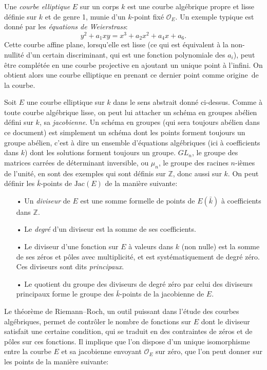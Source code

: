 \documentclass[11pt,a4paper]{article}
\newcommand{\Z}{\mathbb{Z}}
\renewcommand{\O}{\mathcal{O}}
\newcommand{\Jac}{\mathrm{Jac}}
\theoremstyle{definition}
\begin{document}
Une \emph{courbe elliptique} $E$ sur un corps $k$ est une courbe algébrique propre et lisse définie sur $k$ et de genre 1, munie d'un $k$-point fixé $\O_E$. Un exemple typique est donné par les \emph{équations de Weierstrass}:
$$y^2 + a_1xy = x^3 + a_2x^2 + a_4 x + a_6.$$
Cette courbe affine plane, lorsqu'elle est lisse (ce qui est équivalent à la non-nullité d'un certain discriminant, qui est une fonction polynomiale des $a_i$), peut être complétée en une courbe projective en ajoutant un unique point à l'infini. On obtient alors une courbe elliptique en prenant ce dernier point comme \og origine\fg\ de la courbe.

Soit $E$ une courbe elliptique sur $k$ dans le sens abstrait donné ci-dessus. Comme à toute courbe algébrique lisse, on peut lui attacher un schéma en groupes abélien défini sur $k$, sa \emph{jacobienne}. Un schéma en groupes (qui sera toujours abélien dans ce document) est simplement un schéma dont les points forment toujours un groupe abélien, c'est à dire un ensemble d'équations algébriques (ici à coefficients dans $k$) dont les solutions forment toujours un groupe. $GL_n$, le groupe des matrices carrées de déterminant inversible, ou $\mu_n$, le groupe des racines $n$-ièmes de l'unité, en sont des exemples qui sont définis sur $\Z$, donc aussi sur $k$. On peut définir les $\bar{k}$-points de $\Jac(E)$ de la manière suivante:
\begin{itemize}
\item[•] Un \emph{diviseur} de $E$ est une somme formelle de points de $E(\bar{k})$ à coefficients dans $\Z$.
\item[•] Le \emph{degré} d'un diviseur est la somme de ses coefficients.
\item[•] Le diviseur d'une fonction sur $E$ à valeurs dans $k$ (non nulle) est la somme de ses zéros et pôles avec multiplicité, et est systématiquement de degré zéro. Ces diviseurs sont dits \emph{principaux}.
\item[•] Le quotient du groupe des diviseurs de degré zéro par celui des diviseurs principaux forme le groupe des $\bar{k}$-points de la jacobienne de $E$.
\end{itemize}
Le théorème de Riemann--Roch, un outil puissant dans l'étude des courbes algébriques, permet de contrôler le nombre de fonctions sur $E$ dont le diviseur satisfait une certaine condition, qui se traduit en des contraintes de zéros et de pôles sur ces fonctions. Il implique que l'on dispose d'un unique isomorphisme entre la courbe $E$ et sa jacobienne envoyant $\O_E$ sur zéro, que l'on peut donner sur les points de la manière suivante:
\end{document}
